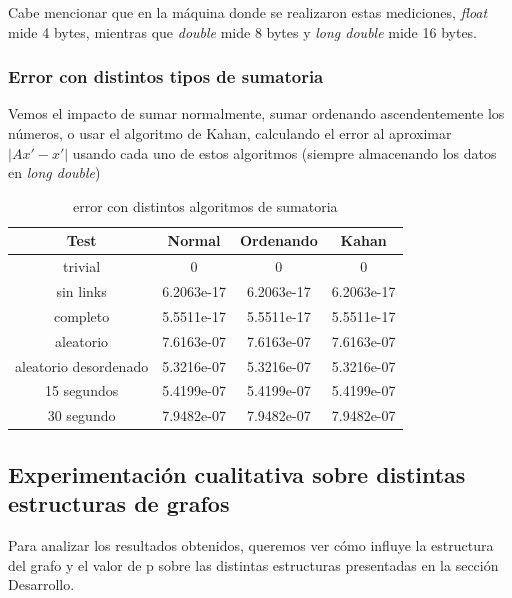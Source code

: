 Cabe mencionar que en la máquina donde se realizaron estas mediciones, \textit{float} mide 4 bytes, mientras que \textit{double} mide 8 bytes y \textit{long double} mide 16 bytes.

\subsubsection{Error con distintos tipos de sumatoria}
Vemos el impacto de sumar normalmente, sumar ordenando ascendentemente los números, o usar el algoritmo de Kahan, calculando el error al aproximar $|Ax' - x'|$ usando cada uno de estos algoritmos (siempre almacenando los datos en \textit{long double})

\begin{table}[H]
\centering
\begin{tabular}{ |c||c|c|c| }
 \hline
 Test & Normal & Ordenando & Kahan \\
 \hline
 \hline
 trivial & 0 & 0 & 0 \\
 sin links & 6.2063e-17 & 6.2063e-17 & 6.2063e-17 \\
 completo & 5.5511e-17 & 5.5511e-17 & 5.5511e-17 \\
 aleatorio & 7.6163e-07 & 7.6163e-07 & 7.6163e-07 \\
 aleatorio desordenado & 5.3216e-07 & 5.3216e-07 & 5.3216e-07 \\
 15 segundos & 5.4199e-07 & 5.4199e-07 & 5.4199e-07 \\
 30 segundo & 7.9482e-07 & 7.9482e-07 & 7.9482e-07 \\
 \hline
\end{tabular}
\caption{error con distintos algoritmos de sumatoria}
\end{table}

\subsection{Experimentación cualitativa sobre distintas estructuras de grafos}
Para analizar los resultados obtenidos, queremos ver cómo influye la estructura del grafo y el valor de p sobre las distintas estructuras presentadas en la sección Desarrollo.

